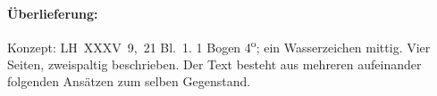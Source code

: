 %
%
%                      
%
%
%
\frenchspacing%
%
%
\begin{ledgroupsized}[r]{120mm}%
\footnotesize%
\pstart%
\noindent\textbf{Überlieferung:}%
\pend%
\end{ledgroupsized}%
\begin{ledgroupsized}[r]{114mm}%
\footnotesize%
\pstart%
\parindent -6mm%
%
Konzept: LH~XXXV~9,~21 Bl.~1.
1 Bogen 4\textsuperscript{o};
ein Wasserzeichen mittig.
Vier Seiten, zweispaltig beschrieben.
Der Text besteht aus mehreren aufeinander folgenden Ansätzen zum selben Gegenstand.
\pend%
\end{ledgroupsized}%
%
%
\vspace*{5mm}%
